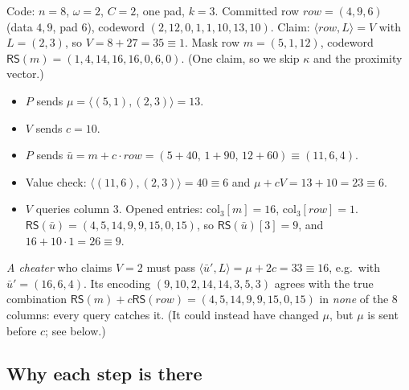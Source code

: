 \documentclass[11pt,a4paper]{article}
\newcommand{\RS}{\mathsf{RS}}
\newcommand{\ip}[2]{\langle #1, #2\rangle}
\theoremstyle{definition}
\theoremstyle{plain}
\begin{document}
\begin{example}
Code: $n=8$, $\omega=2$, $C=2$, one pad, $k=3$. Committed row $\mathit{row}=(4,9,6)$ (data $4,9$, pad $6$),
codeword $(2,12,0,1,1,10,13,10)$. Claim: $\ip{\mathit{row}}{L}=V$ with $L=(2,3)$, so
$V=8+27=35\equiv 1$. Mask row $m=(5,1,12)$, codeword $\RS(m)=(1,4,14,16,16,0,6,0)$. (One claim, so we skip
$\kappa$ and the proximity vector.)
\begin{itemize}[leftmargin=1.2em]
\item $P$ sends $\mu=\ip{(5,1)}{(2,3)}=13$.
\item $V$ sends $c=10$.
\item $P$ sends $\bar u=m+c\cdot\mathit{row}=(5+40,\,1+90,\,12+60)\equiv(11,6,4)$.
\item Value check: $\ip{(11,6)}{(2,3)}=40\equiv 6$ and $\mu+cV=13+10=23\equiv 6$. \checkmark
\item $V$ queries column 3. Opened entries: $\mathrm{col}_3[m]=16$, $\mathrm{col}_3[\mathit{row}]=1$.
  $\RS(\bar u)=(4,5,14,9,9,15,0,15)$, so $\RS(\bar u)[3]=9$, and $16+10\cdot 1=26\equiv 9$. \checkmark
\end{itemize}
\emph{A cheater} who claims $V=2$ must pass $\ip{\bar u'}{L}=\mu+2c=33\equiv 16$, e.g.\ with
$\bar u'=(16,6,4)$. Its encoding $(9,10,2,14,14,3,5,3)$ agrees with the true combination
$\RS(m)+c\RS(\mathit{row})=(4,5,14,9,9,15,0,15)$ in \emph{none} of the 8 columns: every query catches it.
(It could instead have changed $\mu$, but $\mu$ is sent before $c$; see below.)
\end{example}

\subsection{Why each step is there}
\end{document}

